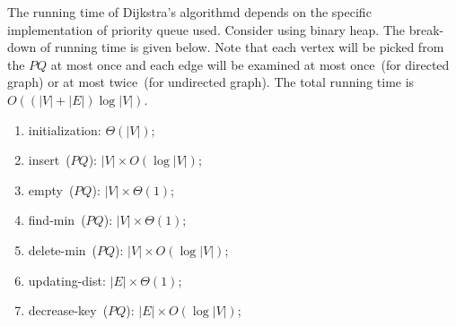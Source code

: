 \begin{algorithmblock}[0.8\textwidth]
	\xxx
	\xxx
	\xxx
	\xxx
	\xxx
	\xxx
	\xxx
	\xxx
	\xxx
	\xxx
	\xxx
	\xxx
	\xxx
\end{algorithmblock}


The running time of Dijkstra's algorithmd depends on the specific implementation of priority queue used.
Consider using binary heap. The break-down of running time is given below.
Note that each vertex will be picked from the $PQ$ at most once and each edge will be examined at most once~(for directed graph) or at most twice~(for undirected graph).
The total running time is $O((|V|+|E|)\log |V|)$.
\begin{enumerate}
\item initialization: $\Theta(|V|)$;
\item insert~($PQ$): $|V| \times O(\log |V|)$;
\item empty~($PQ$): $|V| \times \Theta(1)$;
\item find-min~($PQ$): $|V| \times \Theta(1)$;
\item delete-min~($PQ$): $|V| \times O(\log |V|)$;
\item updating-dist: $|E| \times \Theta(1)$;
\item decrease-key~($PQ$): $|E| \times O(\log |V|)$;
\end{enumerate}

